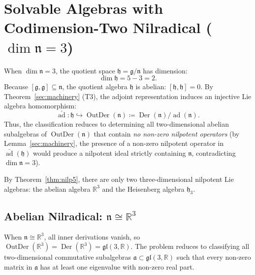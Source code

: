 \documentclass[11pt,a4paper]{article}
\theoremstyle{definition}
\theoremstyle{remark}
\newcommand{\R}{\mathbb{R}}
\newcommand{\g}{\mathfrak{g}}
\newcommand{\n}{\mathfrak{n}}
\newcommand{\hh}{\mathfrak{h}}
\newcommand{\ad}{\operatorname{ad}}
\newcommand{\Der}{\operatorname{Der}}
\newcommand{\OutDer}{\operatorname{OutDer}}
\begin{document}
\section{Solvable Algebras with Codimension-Two Nilradical ($\dim \n = 3$)}\label{sec:nilp3}

When $\dim \n = 3$, the quotient space $\mathfrak{h} = \g / \n$ has dimension:
\begin{equation}
    \dim \mathfrak{h} = 5 - 3 = 2.
\end{equation}
Because $[\g, \g] \subseteq \n$, the quotient algebra $\mathfrak{h}$ is abelian: $[\mathfrak{h}, \mathfrak{h}] = 0$. By Theorem~\ref{sec:machinery} (T3), the adjoint representation induces an injective Lie algebra homomorphism:
\begin{equation}
    \bar{\ad} \colon \mathfrak{h} \hookrightarrow \OutDer(\n) \coloneqq \Der(\n) / \ad(\n).
\end{equation}
Thus, the classification reduces to determining all two-dimensional abelian subalgebras of $\OutDer(\n)$ that contain \emph{no non-zero nilpotent operators} (by Lemma~\ref{sec:machinery}, the presence of a non-zero nilpotent operator in $\bar{\ad}(\mathfrak{h})$ would produce a nilpotent ideal strictly containing $\n$, contradicting $\dim \n = 3$).

By Theorem~\ref{thm:nilp5}, there are only two three-dimensional nilpotent Lie algebras: the abelian algebra $\R^3$ and the Heisenberg algebra $\hh_3$.

\subsection{Abelian Nilradical: $\n \cong \R^3$}\label{subsec:R3_dim3}
When $\n \cong \R^3$, all inner derivations vanish, so $\OutDer(\R^3) = \Der(\R^3) = \mathfrak{gl}(3, \R)$. The problem reduces to classifying all two-dimensional commutative subalgebras $\mathfrak{a} \subset \mathfrak{gl}(3, \R)$ such that every non-zero matrix in $\mathfrak{a}$ has at least one eigenvalue with non-zero real part.
\end{document}
